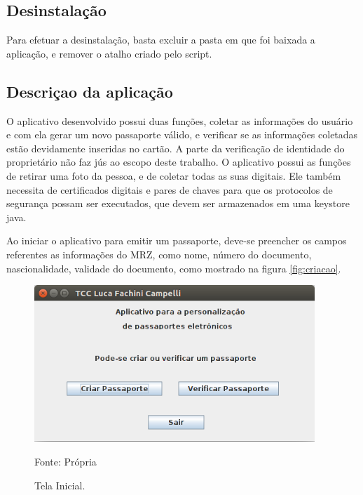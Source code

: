 \documentclass[11pt]{article}
\begin{document}
		\subsection{Desinstalação}
			
			Para efetuar a desinstalação, basta excluir a pasta em que foi baixada a aplicação, e remover o atalho criado pelo script.
			

		\subsection{Descriçao da aplicação}
			
    	O aplicativo desenvolvido possui duas funções, coletar as informações do usuário e com ela gerar um novo passaporte válido, e verificar se as informações coletadas estão devidamente inseridas no cartão. A parte da verificação de identidade do proprietário não faz jús ao escopo deste trabalho. O aplicativo possui as funções de retirar uma foto da pessoa, e de coletar todas as suas digitais. Ele também necessita de certificados digitais e pares de chaves para que os protocolos de segurança possam ser executados, que devem ser armazenados em uma keystore java.
    	 
    	Ao iniciar o aplicativo para emitir um passaporte, deve-se preencher os campos referentes as informações do MRZ, como nome, número do documento, nascionalidade, validade do documento, como mostrado na figura \ref{fig:criacao}. 
    
    
    	\begin{figure}[ht]
    	    \begin{center}
    	      \caption{Tela Inicial.}
    		  \includegraphics[width=300pt]{TelaInicial.png}
    		  
    		  {Fonte: Própria}
    		  \label{fig:telainicial}
    	    \end{center}
    	    
    	\end{figure}
    
\end{document}
